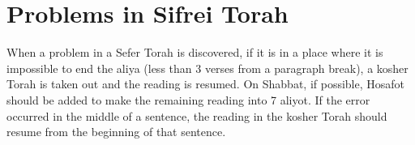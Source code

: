 \documentclass[11pt]{article}
\begin{document}
%
%
%
%
%

\section{Problems in Sifrei Torah}

When a problem in a Sefer Torah is discovered, if it is in a place where it is impossible to end the aliya (less than 3 verses from a paragraph break), a kosher Torah is taken out and the reading is resumed. On Shabbat, if possible, Hosafot should be added to make the remaining reading into 7 aliyot.  If the error occurred in the middle of a sentence, the reading in the kosher Torah should resume from the beginning of that sentence.
\end{document}
